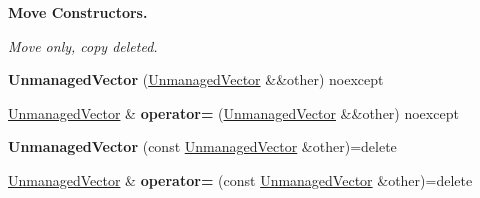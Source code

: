 \begin{Indent}\textbf{ Move Constructors.}\par
{\em Move only, copy deleted. }\begin{DoxyCompactItemize}
\item 
\mbox{\label{classblaze_1_1util_1_1UnmanagedVector_adde99e03709712a5555c769ccaa93ecc}} 
{\bfseries Unmanaged\+Vector} (\hyperlink{classblaze_1_1util_1_1UnmanagedVector}{Unmanaged\+Vector} \&\&other) noexcept
\item 
\mbox{\label{classblaze_1_1util_1_1UnmanagedVector_a071f358ea12fa14456483fdd63d6d8c5}} 
\hyperlink{classblaze_1_1util_1_1UnmanagedVector}{Unmanaged\+Vector} \& {\bfseries operator=} (\hyperlink{classblaze_1_1util_1_1UnmanagedVector}{Unmanaged\+Vector} \&\&other) noexcept
\item 
\mbox{\label{classblaze_1_1util_1_1UnmanagedVector_a854f58df88590cb705768eb408ab7f4a}} 
{\bfseries Unmanaged\+Vector} (const \hyperlink{classblaze_1_1util_1_1UnmanagedVector}{Unmanaged\+Vector} \&other)=delete
\item 
\mbox{\label{classblaze_1_1util_1_1UnmanagedVector_a58ff760293fd63e1eaa84d2fddb93a2d}} 
\hyperlink{classblaze_1_1util_1_1UnmanagedVector}{Unmanaged\+Vector} \& {\bfseries operator=} (const \hyperlink{classblaze_1_1util_1_1UnmanagedVector}{Unmanaged\+Vector} \&other)=delete
\end{DoxyCompactItemize}
\end{Indent}
